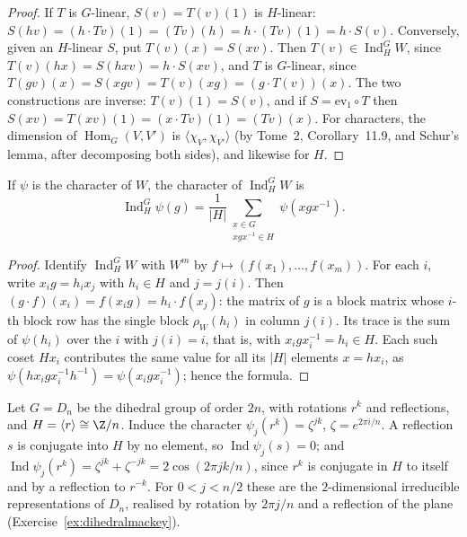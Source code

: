 \begin{proof}
If $T$ is $G$-linear, $S(v)=T(v)(1)$ is $H$-linear: $S(hv)=(h\cdot Tv)(1)=(Tv)(h)=h\cdot(Tv)(1)=h\cdot S(v)$. Conversely, given an $H$-linear $S$, put $T(v)(x)=S(xv)$. Then $T(v)\in\operatorname{Ind}_H^GW$, since
$T(v)(hx)=S(hxv)=h\cdot S(xv)$, and $T$ is $G$-linear, since $T(gv)(x)=S(xgv)=T(v)(xg)=(g\cdot T(v))(x)$. The two constructions are inverse: $T(v)(1)=S(v)$, and if $S=\mathrm{ev}_1\circ T$ then
$S(xv)=T(xv)(1)=(x\cdot Tv)(1)=(Tv)(x)$. For characters, the dimension of $\operatorname{Hom}_G(V,V')$ is $\langle\chi_V,\chi_{V'}\rangle$ (by Tome~2, Corollary~11.9, and Schur's lemma, after decomposing both sides), and likewise
for $H$.
\end{proof}

\begin{proposition}\label{prop:indchar}
If $\psi$ is the character of $W$, the character of $\operatorname{Ind}_H^GW$ is
\[
\operatorname{Ind}_H^G\psi(g)=\frac1{|H|}\sum_{\substack{x\in G\\ xgx^{-1}\in H}}\psi(xgx^{-1}).
\]
\end{proposition}

\begin{proof}
Identify $\operatorname{Ind}_H^GW$ with $W^m$ by $f\mapsto(f(x_1),\dots,f(x_m))$. For each $i$, write $x_ig=h_ix_{j}$ with $h_i\in H$ and $j=j(i)$. Then $(g\cdot f)(x_i)=f(x_ig)=h_i\cdot f(x_j)$: the matrix of $g$ is a block matrix whose
$i$-th block row has the single block $\rho_W(h_i)$ in column $j(i)$. Its trace is the sum of $\psi(h_i)$ over the $i$ with $j(i)=i$, that is, with $x_igx_i^{-1}=h_i\in H$. Each such coset $Hx_i$ contributes the same value for all
its $|H|$ elements $x=hx_i$, as $\psi(hx_igx_i^{-1}h^{-1})=\psi(x_igx_i^{-1})$; hence the formula.
\end{proof}

\begin{example}\label{ex:dihedral}
Let $G=D_n$ be the dihedral group of order $2n$, with rotations $r^k$ and reflections, and $H=\langle r\rangle\cong\Z/n$. Induce the character $\psi_j(r^k)=\zeta^{jk}$, $\zeta=e^{2\pi i/n}$. A reflection $s$ is conjugate into $H$ by no
element, so $\operatorname{Ind}\psi_j(s)=0$; and $\operatorname{Ind}\psi_j(r^k)=\zeta^{jk}+\zeta^{-jk}=2\cos(2\pi jk/n)$, since $r^k$ is conjugate in $H$ to itself and by a reflection to $r^{-k}$. For $0<j<n/2$ these are the
$2$-dimensional irreducible representations of $D_n$, realised by rotation by $2\pi j/n$ and a reflection of the plane (Exercise~\ref{ex:dihedralmackey}).
\end{example}

